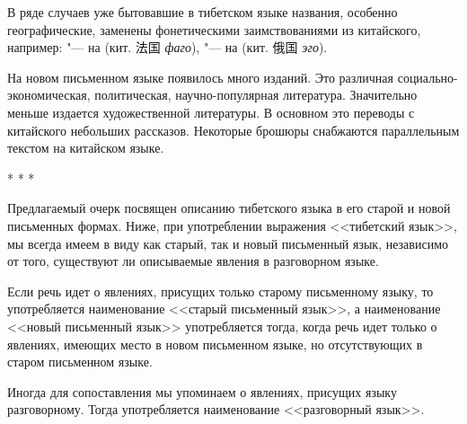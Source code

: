 В ряде случаев уже бытовавшие в тибетском языке названия, особенно географические, заменены фонетическими заимствованиями из китайского, например:  "--- на  (кит. {\unifont 法国} \textit{фаго}),  "--- на  (кит. {\unifont 俄国} \textit{эго}).

На новом письменном языке появилось много изданий. Это различная социально-экономическая, политическая, научно-популярная литература. Значительно меньше издается художественной литературы. В основном это переводы с китайского небольших рассказов. Некоторые брошюры снабжаются параллельным текстом на китайском языке.

\begin{center}
* * *
\end{center}

Предлагаемый очерк посвящен описанию тибетского языка в его старой и новой письменных формах. Ниже, при употреблении выражения <<тибетский язык>>, мы всегда имеем в виду как старый, так и новый письменный язык, независимо от того, существуют ли описываемые явления в разговорном языке.

Если речь идет о явлениях, присущих только старому письменному языку, то употребляется наименование <<старый письменный язык>>, а наименование <<новый письменный язык>> употребляется тогда, когда речь идет только о явлениях, имеющих место в новом письменном языке, но отсутствующих в старом письменном языке.

Иногда для сопоставления мы упоминаем о явлениях, присущих языку разговорному. Тогда употребляется наименование <<разговорный язык>>.


